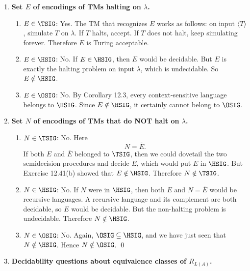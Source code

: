 \begin{enumerate}[{12.}1. ]
\item \textbf{Set $E$ of encodings of TMs halting on $\lambda$.}

\begin{enumerate}
\item \textbf{$E\in\TSIG$}: Yes. The TM that recognizes $E$ works as follows:
on input $\langle T\rangle$, simulate $T$ on $\lambda$. If $T$ halts, accept. If
$T$ does not halt, keep simulating forever. Therefore $E$ is Turing acceptable.

\item \textbf{$E\in\HSIG$}: No. If $E\in\HSIG$, then $E$ would be decidable. But
$E$ is exactly the halting problem on input $\lambda$, which is undecidable. So
$E\notin\HSIG$.

\item \textbf{$E\in\OSIG$}: No. By Corollary 12.3, every context-sensitive
language belongs to $\HSIG$. Since $E\notin\HSIG$, it certainly cannot belong to
$\OSIG$.
\end{enumerate}

\item \textbf{Set $N$ of encodings of TMs that do NOT halt on $\lambda$.}

\begin{enumerate}
\item \textbf{$N\in\TSIG$}: No. Here
\[
N=\overline{E}.
\]
If both $E$ and $\overline{E}$ belonged to $\TSIG$, then we could dovetail the
two semidecision procedures and decide $E$, which would put $E$ in $\HSIG$.
But Exercise 12.41(b) showed that $E\notin\HSIG$. Therefore $N\notin\TSIG$.

\item \textbf{$N\in\HSIG$}: No. If $N$ were in $\HSIG$, then both $E$ and
$N=\overline{E}$ would be recursive languages. A recursive language and its
complement are both decidable, so $E$ would be decidable. But the non-halting
problem is undecidable. Therefore $N\notin\HSIG$.

\item \textbf{$N\in\OSIG$}: No. Again, $\OSIG\subseteq\HSIG$, and we have just
seen that $N\notin\HSIG$. Hence $N\notin\OSIG$. \qed
\end{enumerate}

\item \textbf{Decidability questions about equivalence classes of $R_{L(A)}$.}


\end{enumerate}
